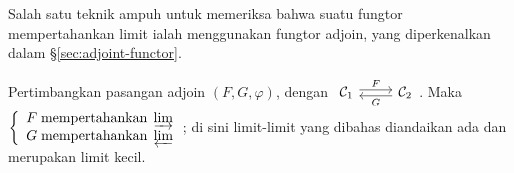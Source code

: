 Salah satu teknik ampuh untuk memeriksa bahwa suatu fungtor mempertahankan limit ialah menggunakan fungtor adjoin, yang diperkenalkan dalam \S\ref{sec:adjoint-functor}.
\begin{theorem}\label{prop:adjuncion-limit}
	Pertimbangkan pasangan adjoin $(F, G, \varphi)$, dengan $\begin{tikzcd} \mathcal{C}_1 \arrow[yshift=0.5ex, r, "F"] & \mathcal{C}_2 \arrow[yshift=-0.5ex, l, "G"] \end{tikzcd}$. Maka
	$\left\{\begin{array}{ll}
		F \;\text{mempertahankan}\; \varinjlim \\
		G \;\text{mempertahankan}\; \varprojlim
	\end{array}\right.$; di sini limit-limit yang dibahas diandaikan ada dan merupakan limit kecil.
\end{theorem}
